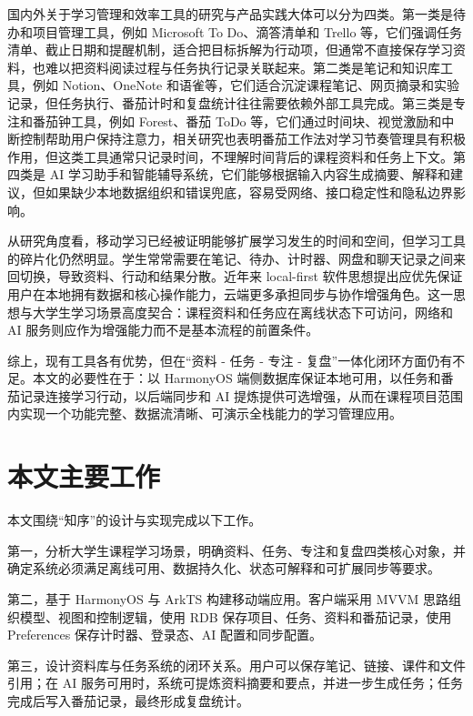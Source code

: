 国内外关于学习管理和效率工具的研究与产品实践大体可以分为四类。第一类是待办和项目管理工具，例如 Microsoft To Do、滴答清单和 Trello 等，它们强调任务清单、截止日期和提醒机制，适合把目标拆解为行动项，但通常不直接保存学习资料，也难以把资料阅读过程与任务执行记录关联起来。第二类是笔记和知识库工具，例如 Notion、OneNote 和语雀等，它们适合沉淀课程笔记、网页摘录和实验记录，但任务执行、番茄计时和复盘统计往往需要依赖外部工具完成。第三类是专注和番茄钟工具，例如 Forest、番茄 ToDo 等，它们通过时间块、视觉激励和中断控制帮助用户保持注意力，相关研究也表明番茄工作法对学习节奏管理具有积极作用\cite{santiago2022pomodoro,cirillo2018pomodoro}，但这类工具通常只记录时间，不理解时间背后的课程资料和任务上下文。第四类是 AI 学习助手和智能辅导系统，它们能够根据输入内容生成摘要、解释和建议\cite{kasneci2023chatgpt,kabudi2021ai}，但如果缺少本地数据组织和错误兜底，容易受网络、接口稳定性和隐私边界影响。

从研究角度看，移动学习已经被证明能够扩展学习发生的时间和空间\cite{crompton2018use,sung2016effects}，但学习工具的碎片化仍然明显。学生常常需要在笔记、待办、计时器、网盘和聊天记录之间来回切换，导致资料、行动和结果分散。近年来 local-first 软件思想提出应优先保证用户在本地拥有数据和核心操作能力，云端更多承担同步与协作增强角色\cite{kleppmann2019localfirst}。这一思想与大学生学习场景高度契合：课程资料和任务应在离线状态下可访问，网络和 AI 服务则应作为增强能力而不是基本流程的前置条件。

综上，现有工具各有优势，但在“资料 - 任务 - 专注 - 复盘”一体化闭环方面仍有不足。本文的必要性在于：以 HarmonyOS 端侧数据库保证本地可用，以任务和番茄记录连接学习行动，以后端同步和 AI 提炼提供可选增强，从而在课程项目范围内实现一个功能完整、数据流清晰、可演示全栈能力的学习管理应用。

\section{本文主要工作}

本文围绕“知序”的设计与实现完成以下工作。

第一，分析大学生课程学习场景，明确资料、任务、专注和复盘四类核心对象，并确定系统必须满足离线可用、数据持久化、状态可解释和可扩展同步等要求。

第二，基于 HarmonyOS 与 ArkTS 构建移动端应用。客户端采用 MVVM 思路组织模型、视图和控制逻辑，使用 RDB 保存项目、任务、资料和番茄记录，使用 Preferences 保存计时器、登录态、AI 配置和同步配置。

第三，设计资料库与任务系统的闭环关系。用户可以保存笔记、链接、课件和文件引用；在 AI 服务可用时，系统可提炼资料摘要和要点，并进一步生成任务；任务完成后写入番茄记录，最终形成复盘统计。


